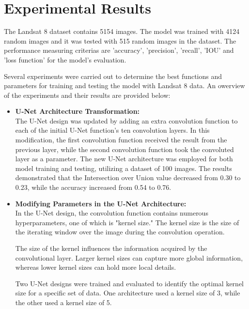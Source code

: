 \documentclass[conference]{IEEEtran}
\begin{document}
\section{Experimental Results}

The Landsat 8 dataset contains 5154 images. The model was trained with 4124 random images and it was tested with 515 random images in the dataset. The performance measuring criterias are 'accuracy', 'precision', 'recall', 'IOU' and 'loss function' for the model's evaluation. 

Several experiments were carried out to determine the best functions and parameters for training and testing the model with Landsat 8 data. An owerview of the experiments and their results are provided below:

\begin{itemize}
    \item \textbf{U-Net Architecture Transformation:}\\
    
        The U-Net design was updated by adding an extra convolution function to each of the initial U-Net function's ten convolution layers. In this modification, the first convolution function received the result from the previous layer, while the second convolution function took the convoluted layer as a parameter. The new U-Net architecture was employed for both model training and testing, utilizing a dataset of 100 images. The results demonstrated that the Intersection over Union value decreased from 0.30 to 0.23, while the accuracy increased from 0.54 to 0.76.
        \\
    \item \textbf{Modifying Parameters in the U-Net Architecture:}\\
    
        In the U-Net design, the convolution function contains numerous hyperparameters, one of which is "kernel size." The kernel size is the size of the iterating window over the image during the convolution operation.

        The size of the kernel influences the information acquired by the convolutional layer. Larger kernel sizes can capture more global information, whereas lower kernel sizes can hold more local details.

        Two U-Net designs were trained and evaluated to identify the optimal kernel size for a specific set of data. One architecture used a kernel size of 3, while the other used a kernel size of 5.
        

\end{itemize}
\end{document}
